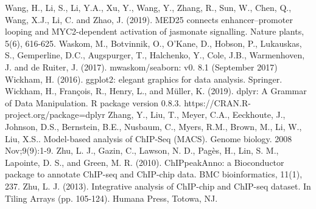 \documentclass{article}
\begin{document}
\begin{sloppypar}
\begin{thebibliography}{9}
Wang, H., Li, S., Li, Y.A., Xu, Y., Wang, Y., Zhang, R., Sun, W., Chen, Q., Wang, X.J., Li, C. and Zhao, J. (2019). MED25 connects enhancer–promoter looping and MYC2-dependent activation of jasmonate signalling. Nature plants, 5(6), 616-625.
Waskom, M., Botvinnik, O., O’Kane, D., Hobson, P., Lukauskas, S., Gemperline, D.C., Augspurger, T., Halchenko, Y., Cole, J.B., Warmenhoven, J. and de Ruiter, J. (2017). mwaskom/seaborn: v0. 8.1 (September 2017)
Wickham, H. (2016). ggplot2: elegant graphics for data analysis. Springer.
Wickham, H., François, R., Henry, L., and Müller, K. (2019). dplyr: A Grammar of Data Manipulation. R package version 0.8.3. https://CRAN.R-project.org/package=dplyr
Zhang, Y., Liu, T., Meyer, C.A., Eeckhoute, J., Johnson, D.S., Bernstein, B.E., Nusbaum, C., Myers, R.M., Brown, M., Li, W., Liu, X.S.. Model-based analysis of ChIP-Seq (MACS). Genome biology. 2008 Nov;9(9):1-9.
Zhu, L. J., Gazin, C., Lawson, N. D., Pagès, H., Lin, S. M., Lapointe, D. S., and Green, M. R. (2010). ChIPpeakAnno: a Bioconductor package to annotate ChIP-seq and ChIP-chip data. BMC bioinformatics, 11(1), 237.
Zhu, L. J. (2013). Integrative analysis of ChIP-chip and ChIP-seq dataset. In Tiling Arrays (pp. 105-124). Humana Press, Totowa, NJ.
\end{thebibliography}

\end{sloppypar}
\end{document}
